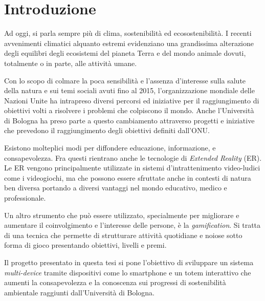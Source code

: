 \chapter{Introduzione}

Ad oggi, si parla sempre più di clima, sostenibilità ed ecosostenibilità. I recenti avvenimenti climatici alquanto estremi evidenziano una grandissima alterazione degli equilibri degli ecosistemi del pianeta Terra e del mondo animale dovuti, totalmente o in parte, alle attività umane.
\vspace{10pt}

Con lo scopo di colmare la poca sensibilità e l'assenza d'interesse sulla salute della natura e sui temi sociali avuti fino al 2015, l'organizzazione mondiale delle Nazioni Unite ha intrapreso diversi percorsi ed iniziative per il raggiungimento di obiettivi volti a risolvere i problemi che colpiscono il mondo. Anche l'Università di Bologna ha preso parte a questo cambiamento attraverso progetti e iniziative che prevedono il raggiungimento degli obiettivi definiti dall'ONU.
\vspace{10pt}

Esistono molteplici modi per diffondere educazione, informazione, e consapevolezza. Fra questi rientrano anche le tecnologie di \textit{Extended Reality} (ER). Le ER vengono principalmente  utilizzate in sistemi d'intrattenimento video-ludici come i videogiochi, ma che possono essere sfruttate anche in contesti di natura ben diversa portando a diversi vantaggi nel mondo educativo, medico e professionale.
\vspace{10pt}

Un altro strumento che può essere utilizzato, specialmente per migliorare e aumentare il coinvolgimento e l'interesse delle persone, è la \textit{gamification}. Si tratta di una tecnica che permette di strutturare attività quotidiane e noiose sotto forma di gioco presentando obiettivi, livelli e premi.
\vspace{10pt}

Il progetto presentato in questa tesi si pone l'obiettivo di sviluppare un sistema \textit{multi-device} tramite dispositivi come lo smartphone e un totem interattivo che aumenti la consapevolezza e la conoscenza sui progressi di sostenibilità ambientale raggiunti dall'Università di Bologna.
\vspace{10pt}

